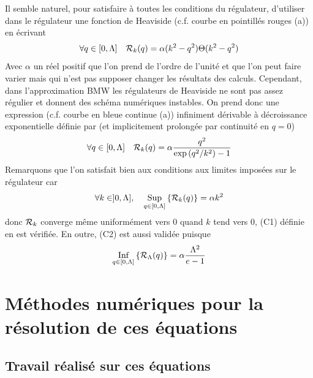 \documentclass[10pt]{article}
\begin{document}
\begin{multicols}{2}
Il semble naturel, pour satisfaire à toutes les conditions  du régulateur, d'utiliser dans le régulateur une fonction de Heaviside (c.f. courbe en pointillés rouges  (a)) en écrivant 
\begin{equation}
	\forall q \in [0, \Lambda] \quad \mathcal{R}_k(q) = \alpha (k^2 - q^2) \Theta(k^2 - q^2)
	\label{eq:RegHeav}
\end{equation}
Avec $\alpha$ un réel positif que l'on prend de l'ordre de l'unité et que l'on peut faire varier mais qui n'est pas supposer changer les résultats des calculs. Cependant, dans l'approximation BMW les régulateurs de Heaviside ne sont pas assez régulier et donnent des schéma numériques instables. On prend donc une expression (c.f. courbe en bleue continue  (a)) infiniment dérivable à décroissance exponentielle définie par (et implicitement prolongée par continuité en $q = 0$)
\begin{equation}
	\forall q \in [0, \Lambda] \quad \mathcal{R}_k(q) = \alpha \frac{q^2}{\exp{(q^2/k^2)}-1}
	\label{eq:RegExp}
\end{equation}
Remarquons que l'on satisfait bien aux conditions aux limites imposées sur le régulateur car 
\begin{equation}
	\forall k \in ]0,\Lambda],  \quad \underset{q \in [0, \Lambda]}{ \text{Sup}} \left\{ \mathcal{R}_k(q) \right\} = \alpha k^2
\end{equation}
donc $\mathcal{R}_k$ converge même uniformément vers 0 quand $k$ tend vers 0, (C1) définie en  est vérifiée. En outre, (C2) est aussi validée puisque
\begin{equation}
	\underset{q \in [0, \Lambda]}{ \text{Inf}} \left\{ \mathcal{R}_\Lambda(q) \right\} = \alpha \frac{\Lambda^2}{e-1}
\end{equation}


\vspace*{11pt}

\section{Méthodes numériques pour la résolution de ces équations}

\subsection{Travail réalisé sur ces équations}





\end{multicols}
\end{document}
